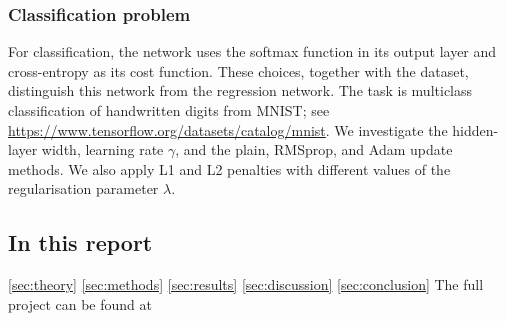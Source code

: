 \subsubsection{Classification problem}
For classification, the network uses the softmax function in its output layer
and cross-entropy as its cost function. These choices, together with the
dataset, distinguish this network from the regression network. The task is
multiclass classification of handwritten digits from MNIST; see
\url{https://www.tensorflow.org/datasets/catalog/mnist}. We investigate the
hidden-layer width, learning rate $\gamma$, and the plain, RMSprop, and Adam
update methods. We also apply L1 and L2 penalties with different values of
the regularisation parameter $\lambda$.

\subsection{In this report}
\ref{sec:theory}
\ref{sec:methods}
\ref{sec:results}
\ref{sec:discussion}
\ref{sec:conclusion}
The full project can be found at \cite{FYSSTK4155Prosjekt2Main} 

